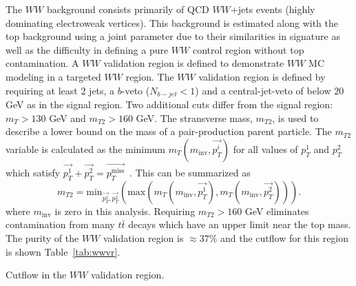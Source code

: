 The $WW$ background consists primarily of QCD $WW$+jets events (highly dominating electroweak vertices). This background is estimated along with the top background using a joint parameter due to their similarities in signature as well as the difficulty in defining a pure $WW$ control region without top contamination. A $WW$ validation region is defined to demonstrate $WW$ MC modeling in a targeted $WW$ region.  The $WW$ validation region is defined by requiring at least 2 jets, a $b$-veto ($N_{b-jet}<1$) and a central-jet-veto of below $20$ GeV as in the signal region. Two additional cuts differ from the signal region: $m_T>130$ GeV and $m_{T2}>160$ GeV. The stransverse mass, $m_{T2}$, is used to describe a lower bound on the mass of a pair-production parent particle. The $m_{T2}$ variable is calculated as the minimum $m_T(m_{\text{inv}},\vec{p_T^i})$ for all values of $p_T^1$ and $p_T^2$ which satisfy $\vec{p_T^1}+\vec{p_T^2}=\vec{p_T^{\text{miss}}}$~\cite{MT2}. This can be summarized as
\begin{equation}
m_{T2}=\text{min}_{\vec{p_T^1},\vec{p_T^2}}(\text{max}(m_T(m_{\text{inv}},\vec{p_T^1}),m_T(m_{\text{inv}},\vec{p_T^2}))).
\end{equation}
where $m_{\text{inv}}$ is zero in this analysis. Requiring $m_{T2}>160$ GeV eliminates contamination from many $t\bar{t}$ decays which have an upper limit near the top mass. The purity of the $WW$ validation region is $\approx 37\%$ and the cutflow for this region is shown Table~\ref{tab:wwvr}.

\begin{table}[h!]
\centering
\resizebox{\textwidth}{!}{

}
\caption{Cutflow in the $WW$ validation region.}
\label{tab:wwvr}
\end{table}

